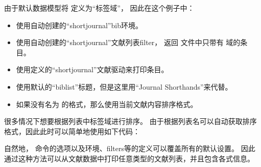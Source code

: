 \begin{ltxsyntax}
\begin{ltxexample}
\end{ltxexample}
%
由于默认数据模型将  定义为“标签域”，
因此在这个例子中：
\begin{itemize}
\item %
使用自动创建的“shortjournal”bib环境。
\item %
使用自动创建的“shortjournal”文献列表filter，
返回  文件中只带有  域的条目。
\item %
使用定义的“shortjournal”文献驱动来打印条目。
\item %
使用默认的“biblist”标题，但是这里用“Journal Shorthands”来代替。
\item %
如果没有名为  的格式，那么使用当前文献内容排序格式。
\end{itemize}
%
很多情况下想要根据列表中标签域进行排序。
由于根据列表名可以自动获取排序格式，因此此时可以简单地使用如下代码：

\begin{ltxexample}
\end{ltxexample}


自然地， 命令的选项以及环境、filters等的定义可以覆盖所有的默认设置。
因此通过这种方法可以从文献数据中打印任意类型的文献列表，并且包含各式信息。 
\end{ltxsyntax}

